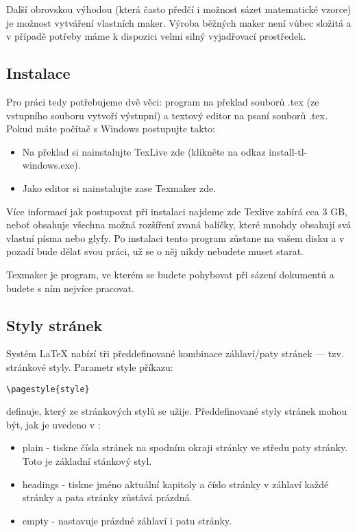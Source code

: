 \documentclass[a4paper, 11pt]{article}
\begin{document}
Další obrovskou výhodou (která často předčí i možnost sázet matematické vzorce) je možnost vytváření vlastních maker. Výroba běžných maker není vůbec složitá a v případě potřeby máme k dispozici velmi silný vyjadřovací prostředek.\cite{Martinek2010}

\subsection{Instalace}

Pro práci tedy potřebujeme dvě věci: program na překlad souborů .tex (ze vstupního souboru vytvoří výstupní) a textový editor na psaní souborů .tex. Pokud máte počítač s Windows postupujte takto:

\begin{itemize}
    \item Na překlad si nainstalujte TexLive zde (klikněte na odkaz install-tl-windows.exe).
    \item Jako editor si nainstalujte zase Texmaker zde.
\end{itemize}

Více informací jak postupovat při instalaci najdeme zde \cite{Vyfuk2024}
\noindent Texlive zabírá cca 3 GB, neboť obsahuje všechna možná rozšíření zvaná balíčky, které mnohdy obsahují svá vlastní písma nebo glyfy. Po instalaci tento program zůstane na vašem disku a v pozadí bude dělat svou práci, už se o něj nikdy nebudete muset starat.

\noindent Texmaker je program, ve kterém se budete pohybovat při sázení dokumentů a budete s ním nejvíce pracovat.

\subsection{Styly stránek}
Systém \LaTeX \hspace{0.1em} nabízí tři předdefinované kombinace záhlaví/paty stránek --- tzv. stránkové styly. Parametr style příkazu: 
\vspace{12pt}

\verb|\pagestyle{style}|
\vspace{12pt}

\begin{flushleft}
definuje, který ze stránkových stylů se užije. Předdefinované styly stránek mohou být, jak je uvedeno v \cite{Zmitko2015}:
\end{flushleft}


\begin{itemize}
    \item plain - tiskne čísla stránek na spodním okraji stránky ve středu paty stránky. Toto je základní stánkový styl.
    \item headings - tiskne jméno aktuální kapitoly a číslo stránky v záhlaví každé stránky a pata stránky zůstává prázdná.
    \item empty - nastavuje prázdné záhlaví i patu stránky.
\end{itemize}
\end{document}
